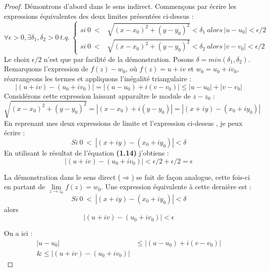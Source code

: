\begin{proof}
	Démontrons d'abord dans le sens indirect. Commençons par écrire les expressions équivalentes des
	deux limites présentées ci-dessus :
	\begin{equation}
		\forall \epsilon > 0, \exists \delta_1, \delta_2 > 0\ t.q.\ 
		\left\{\begin{array}{cc}
		si\ 0\ <& \sqrt{(x-x_0)^2+(y-y_0)^2}<\delta_1\ alors\ |u-u_0|<\epsilon/2 \\
		si\ 0\ <& \sqrt{(x-x_0)^2+(y-y_0)^2}<\delta_2\ alors\ |v-v_0|<\epsilon/2 
		\end{array}\right.
	\end{equation}
	Le choix $\epsilon/2$ n'est que par facilité de la démonstration. Posons $\delta = min(\delta_1
	,\delta_2)$. Remarquons l'expression de $f(z) - w_0$, où $f(z) = u+iv$ et $w_0 = u_0+iv_0$,
	réarrangeons les termes et appliquons l'inégalité triangulaire :
	\begin{equation}
		|(u+iv) - (u_0+iv_0)| = |(u-u_0)+i(v-v_0)| \leq |u-u_0| + |v-v_0|
	\end{equation}
	Considérons cette expression laissant apparaître le module de $z-z_0$ :
	\begin{equation}
		\sqrt{(x-x_0)^2+(y-y_0)^2} = |(x-x_0)+i(y-y_0)| = |(x+iy)-(x_0+iy_0)|
	\end{equation}
	En reprenant mes deux expressions de limite et l'expression ci-dessus , je peux écrire :
	\begin{equation}
		Si\ 0\ <\ |(x+iy) - (x_0+iy_0)| < \delta
	\end{equation}
	En utilisant le résultat de l'équation \textbf{(1.14)} j'obtiens :
	\begin{equation}
		|(u+iv) - (u_0+iv_0)| < \epsilon/2 + \epsilon/2 = \epsilon
	\end{equation}
	    
	    
	La démonstration dans le sens direct ($\Rightarrow$) se fait de façon analogue, cette fois-ci
	en partant de $\lim\limits_{z\rightarrow z_0} f(z) = w_0$. Une expression équivalente à cette
	dernière est :
	\begin{equation}
		Si\ 0\ <\ |(x+iy) - (x_0+iy_0)|<\delta
	\end{equation}
	alors
	\begin{equation}
		|(u+iv)-(u_0+iv_0)|<\epsilon
	\end{equation}
	    
	On a ici :
	\begin{equation}
		\begin{array}{cc}
			|u-u_0| & \leq |(u-u_0)+i(v-v_0)|  \\
			\&\leq |(u+iv)-(u_0+iv_0)| &                          
		\end{array}
	\end{equation}
	    

\end{proof}
